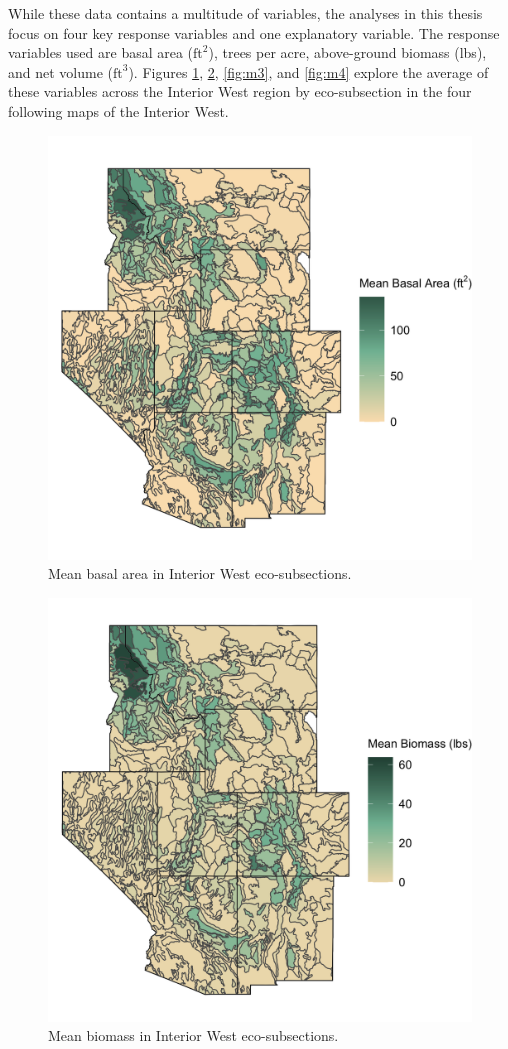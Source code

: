 \documentclass[12pt,twoside]{reedthesis}
\begin{document}
While these data contains a multitude of variables, the analyses in this thesis focus on four key response variables and one explanatory variable. The response variables used are basal area (\(\text{ft}^2\)), trees per acre, above-ground biomass (lbs), and net volume (\(\text{ft}^3\)). Figures \ref{fig:m1}, \ref{fig:m2}, \ref{fig:m3}, and \ref{fig:m4} explore the average of these variables across the Interior West region by eco-subsection in the four following maps of the Interior West.
\begin{figure}

{\centering \includegraphics[width=0.65\linewidth]{figure/basal_new} 

}

\caption[Mean basal area in Interior West eco-subsections]{Mean basal area in Interior West eco-subsections.}\label{fig:m1}
\end{figure}
\begin{figure}

{\centering \includegraphics[width=0.65\linewidth]{figure/biomass_new} 

}

\caption[Mean biomass in Interior West eco-subsections]{Mean biomass in Interior West eco-subsections.}\label{fig:m2}
\end{figure}
\end{document}
